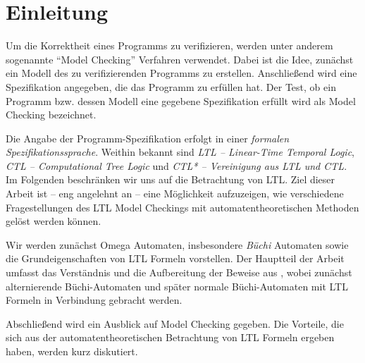 \section{Einleitung}

Um die Korrektheit eines Programms zu verifizieren, werden unter anderem sogenannte "`Model Checking"' Verfahren verwendet. Dabei ist die Idee, zunächst ein Modell des zu verifizierenden Programms zu erstellen. Anschließend wird eine Spezifikation angegeben, die das Programm zu erfüllen hat. Der Test, ob ein Programm bzw. dessen Modell eine gegebene Spezifikation erfüllt wird als Model Checking bezeichnet.

Die Angabe der Programm-Spezifikation erfolgt in einer \textit{formalen Spezifikationssprache}. Weithin bekannt sind \textit{LTL -- Linear-Time Temporal Logic}, \textit{CTL -- Computational Tree Logic} und \textit{CTL* -- Vereinigung aus LTL und CTL}. Im Folgenden beschränken wir uns auf die Betrachtung von LTL. Ziel dieser Arbeit ist -- eng angelehnt an \cite{vardi+96} -- eine Möglichkeit aufzuzeigen, wie verschiedene Fragestellungen des LTL Model Checkings mit automatentheoretischen Methoden gelöst werden können. 

Wir werden zunächst Omega Automaten, insbesondere \textit{Büchi} Automaten sowie die Grundeigenschaften von LTL Formeln vorstellen. Der Hauptteil der Arbeit umfasst das Verständnis und die Aufbereitung der Beweise aus \cite{vardi+96}, wobei zunächst alternierende Büchi-Automaten und später normale Büchi-Automaten mit LTL Formeln in Verbindung gebracht werden.

Abschließend wird ein Ausblick auf Model Checking gegeben. Die Vorteile, die sich aus der automatentheoretischen Betrachtung von LTL Formeln ergeben haben, werden kurz diskutiert.